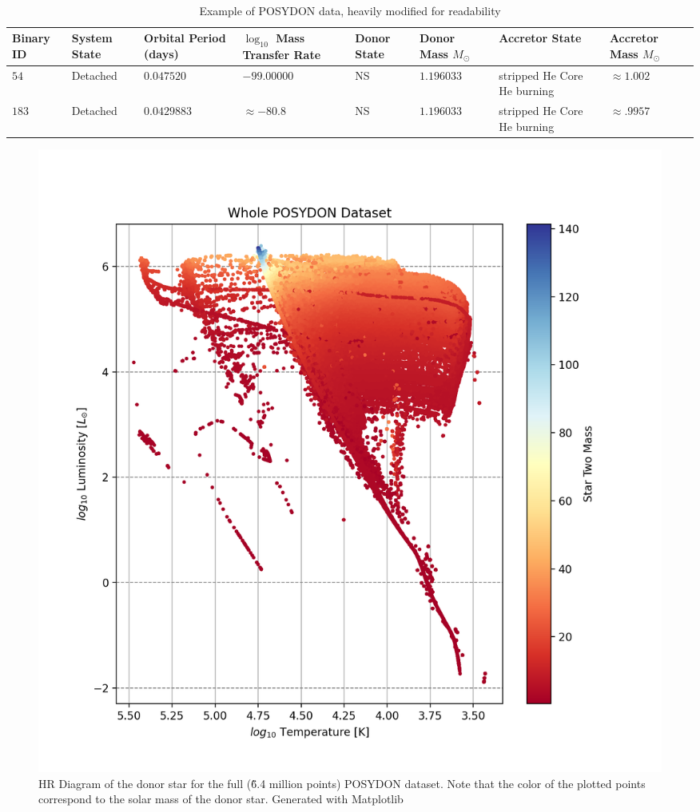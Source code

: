 \documentclass[12pt, a4paper]{article}
\begin{document}
         \begin{table}
            \centering\
            \footnotesize
            \begin{tabularx}{\textwidth}{||X | X | X | X | X | X | X | X ||}
                \hline 
                \textbf{Binary ID} & 
                \textbf{System State} & 
                \textbf{Orbital Period (days)} & 
                \boldmath$\log_{10}$ \textbf{Mass Transfer Rate} & 
                \textbf{Donor State} & 
                \textbf{Donor Mass} $M_\odot$ & 
                \textbf{Accretor State} & 
                \textbf{Accretor Mass} $M_\odot$
                \\ \hline \hline
                $54$ & Detached & $0.047520$ & $-99.00000$ & NS & $1.196033$ & stripped He Core He burning & $\approx 1.002$ \\
                \hline
                $183$ & Detached & $0.0429883$ & $ \approx -80.8$ & NS & $1.196033$ & stripped He Core He burning & $\approx .9957$ \\
                \hline
            \end{tabularx}
            \caption{Example of POSYDON data, heavily modified for readability}
            \label{POSYDONDataExample}
        \end{table}

        \begin{figure} [H]
            \centering
            \includegraphics[width = \textwidth]{figs/GeneratedFigs/WholePOSYDONDatasetExample.png}
            \caption{HR Diagram of the donor star for the full (\~6.4 million points) POSYDON dataset. Note that the color of the plotted points correspond to the solar mass of the donor star. Generated with Matplotlib}
            \label{EntireDataSetHR}
        \end{figure}
\end{document}
